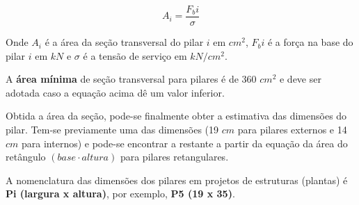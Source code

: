 $$A_i = \frac{F_bi}{\sigma}$$

Onde $A_i$ é a área da seção transversal do pilar $i$ em $cm^2$, $F_bi$ é a força na base do pilar $i$ em $kN$ e $\sigma$ é a tensão de serviço em $kN/cm^2$.

A \textbf{área mínima} de seção transversal para pilares é de $360$ $cm^2$ e deve ser adotada caso a equação acima dê um valor inferior.

Obtida a área da seção, pode-se finalmente obter a estimativa das dimensões do pilar. Tem-se previamente uma das dimensões (19 $cm$ para pilares externos e 14 $cm$ para internos) e pode-se encontrar a restante a partir da equação da área do retângulo $(base \cdot altura)$ para pilares retangulares.

A nomenclatura das dimensões dos pilares em projetos de estruturas (plantas) é \textbf{Pi (largura x altura)}, por exemplo, \textbf{P5 (19 x 35)}.